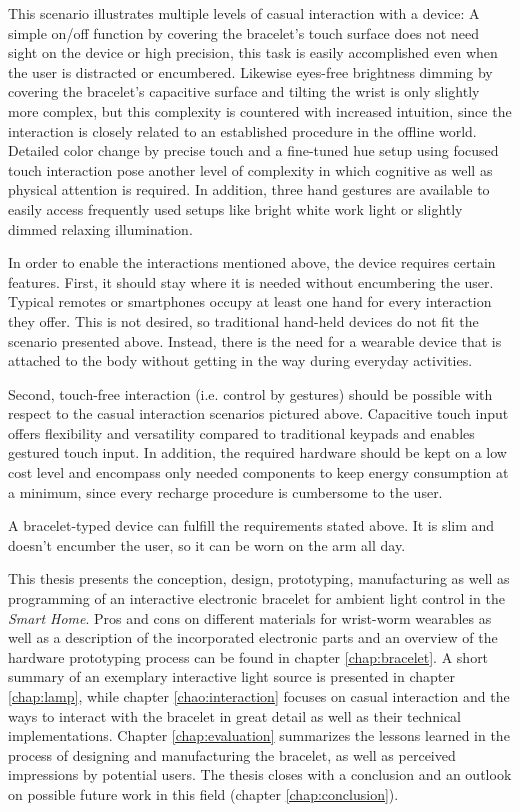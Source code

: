 This scenario illustrates multiple levels of casual interaction with a device: A simple on/off function by covering the bracelet's touch surface does not need sight on the device or high precision, this task is easily accomplished even when the user is distracted or encumbered. Likewise eyes-free brightness dimming by covering the bracelet's capacitive surface and tilting the wrist is only slightly more complex, but this complexity is countered with increased intuition, since the interaction is closely related to an established procedure in the offline world. Detailed color change by precise touch and a fine-tuned hue setup using focused touch interaction pose another level of complexity in which cognitive as well as physical attention is required. In addition, three hand gestures are available to easily access frequently used setups like bright white work light or slightly dimmed relaxing illumination.

In order to enable the interactions mentioned above, the device requires certain features. First, it should stay where it is needed without encumbering the user. Typical remotes or smartphones occupy at least one hand for every interaction they offer. This is not desired, so traditional hand-held devices do not fit the scenario presented above. Instead, there is the need for a wearable device that is attached to the body without getting in the way during everyday activities.

Second, touch-free interaction (i.e. control by gestures) should be possible with respect to the casual interaction scenarios pictured above. Capacitive touch input offers flexibility and versatility compared to traditional keypads and enables gestured touch input. In addition, the required hardware should be kept on a low cost level and encompass only needed components to keep energy consumption at a minimum, since every recharge procedure is cumbersome to the user.

A bracelet-typed device can fulfill the requirements stated above. It is slim and doesn't encumber the user, so it can be worn on the arm all day.

This thesis presents the conception, design, prototyping, manufacturing as well as programming of an interactive electronic bracelet for ambient light control in the \textit{Smart Home}. Pros and cons on different materials for wrist-worm wearables as well as a description of the incorporated electronic parts and an overview of the hardware prototyping process can be found in chapter \ref{chap:bracelet}. A short summary of an exemplary interactive light source is presented in chapter \ref{chap:lamp}, while chapter \ref{chao:interaction} focuses on casual interaction and the ways to interact with the bracelet in great detail as well as their technical implementations. Chapter \ref{chap:evaluation} summarizes the lessons learned in the process of designing and manufacturing the bracelet, as well as perceived impressions by potential users. The thesis closes with a conclusion and an outlook on possible future work in this field (chapter \ref{chap:conclusion}).